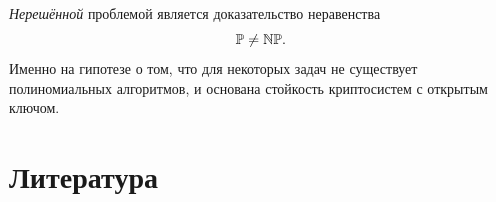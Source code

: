 \emph{Нерешённой} проблемой является доказательство неравенства
    \[ \mathbb{P} \neq \mathbb{NP}. \]
Именно на гипотезе о том, что для некоторых задач не существует полиномиальных алгоритмов, и основана стойкость криптосистем с открытым ключом.





\printindex

\chapter*{Литература}
\begingroup
\renewcommand{\chapter}[2]{}%
%
%
\printbibliography
\endgroup


